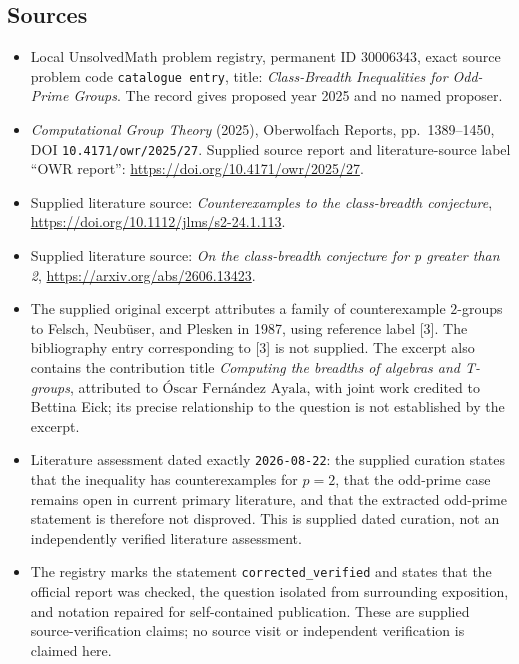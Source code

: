 \documentclass[11pt]{article}
\begin{document}
\subsection{Sources}
\begin{itemize}
\item Local UnsolvedMath problem registry, permanent ID \(30006343\), exact source problem code \texttt{catalogue entry}, title: \emph{Class-Breadth Inequalities for Odd-Prime Groups}. The record gives proposed year 2025 and no named proposer.
\item \emph{Computational Group Theory} (2025), Oberwolfach Reports, pp.\ 1389--1450, DOI \texttt{10.4171/owr/2025/27}. Supplied source report and literature-source label ``OWR report'': \url{https://doi.org/10.4171/owr/2025/27}.
\item Supplied literature source: \emph{Counterexamples to the class-breadth conjecture}, \url{https://doi.org/10.1112/jlms/s2-24.1.113}.
\item Supplied literature source: \emph{On the class-breadth conjecture for p greater than 2}, \url{https://arxiv.org/abs/2606.13423}.
\item The supplied original excerpt attributes a family of counterexample \(2\)-groups to Felsch, Neub\"user, and Plesken in 1987, using reference label [3]. The bibliography entry corresponding to [3] is not supplied. The excerpt also contains the contribution title \emph{Computing the breadths of algebras and T-groups}, attributed to \(\text{\'Oscar Fern\'andez Ayala}\), with joint work credited to Bettina Eick; its precise relationship to the question is not established by the excerpt.
\item Literature assessment dated exactly \texttt{2026-08-22}: the supplied curation states that the inequality has counterexamples for \(p=2\), that the odd-prime case remains open in current primary literature, and that the extracted odd-prime statement is therefore not disproved. This is supplied dated curation, not an independently verified literature assessment.
\item The registry marks the statement \texttt{corrected\_verified} and states that the official report was checked, the question isolated from surrounding exposition, and notation repaired for self-contained publication. These are supplied source-verification claims; no source visit or independent verification is claimed here.
\end{itemize}
\end{document}
